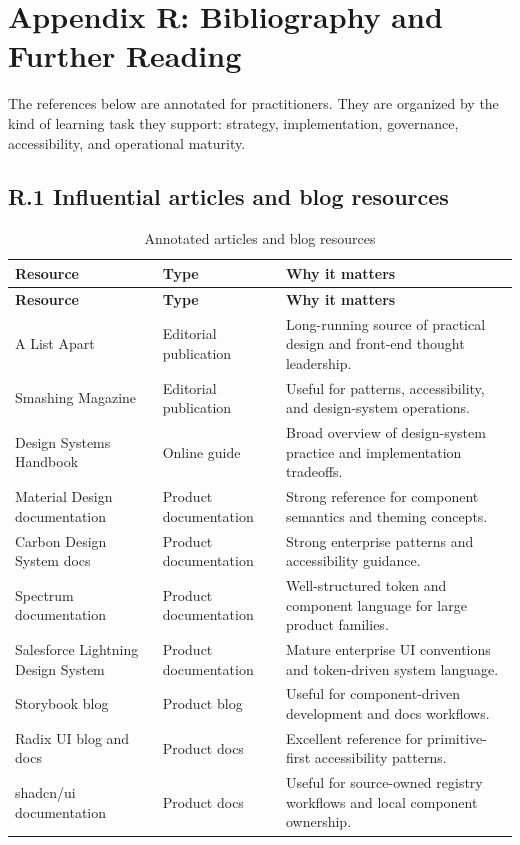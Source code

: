 \clearpage
{}
\section*{Appendix R: Bibliography and Further Reading}

The references below are annotated for practitioners. They are organized by the kind of learning task they support: strategy, implementation, governance, accessibility, and operational maturity.

\subsection*{R.1 Influential articles and blog resources}
\begin{longtable}{@{}p{}p{}p{}@{}}
\caption{Annotated articles and blog resources}\label{tab:bibliography-articles}\\
\toprule
\textbf{Resource} & \textbf{Type} & \textbf{Why it matters} \\
\midrule
\endfirsthead
\toprule
\textbf{Resource} & \textbf{Type} & \textbf{Why it matters} \\
\midrule
\endhead
\bottomrule
\endfoot
A List Apart & Editorial publication & Long-running source of practical design and front-end thought leadership. \\
Smashing Magazine & Editorial publication & Useful for patterns, accessibility, and design-system operations. \\
Design Systems Handbook & Online guide & Broad overview of design-system practice and implementation tradeoffs. \\
Material Design documentation & Product documentation & Strong reference for component semantics and theming concepts. \\
Carbon Design System docs & Product documentation & Strong enterprise patterns and accessibility guidance. \\
Spectrum documentation & Product documentation & Well-structured token and component language for large product families. \\
Salesforce Lightning Design System & Product documentation & Mature enterprise UI conventions and token-driven system language. \\
Storybook blog & Product blog & Useful for component-driven development and docs workflows. \\
Radix UI blog and docs & Product docs & Excellent reference for primitive-first accessibility patterns. \\
shadcn/ui documentation & Product docs & Useful for source-owned registry workflows and local component ownership. \\
\end{longtable}

